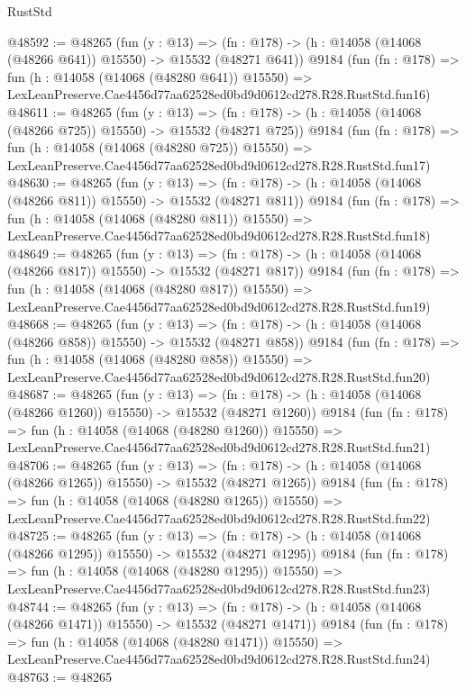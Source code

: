 \begin{lexlean}{RustStd}
\begin{coremodule}
@48592 := @48265
    (fun (y : @13) =>
    (fn : @178) -> (h : @14058 (@14068 (@48266 @641)) @15550) -> @15532 (@48271 @641))
    @9184
    (fun (fn : @178) =>
    fun (h : @14058 (@14068 (@48280 @641)) @15550) =>
    LexLeanPreserve.Cae4456d77aa62528ed0bd9d0612cd278.R28.RustStd.fun16)
@48611 := @48265
    (fun (y : @13) =>
    (fn : @178) -> (h : @14058 (@14068 (@48266 @725)) @15550) -> @15532 (@48271 @725))
    @9184
    (fun (fn : @178) =>
    fun (h : @14058 (@14068 (@48280 @725)) @15550) =>
    LexLeanPreserve.Cae4456d77aa62528ed0bd9d0612cd278.R28.RustStd.fun17)
@48630 := @48265
    (fun (y : @13) =>
    (fn : @178) -> (h : @14058 (@14068 (@48266 @811)) @15550) -> @15532 (@48271 @811))
    @9184
    (fun (fn : @178) =>
    fun (h : @14058 (@14068 (@48280 @811)) @15550) =>
    LexLeanPreserve.Cae4456d77aa62528ed0bd9d0612cd278.R28.RustStd.fun18)
@48649 := @48265
    (fun (y : @13) =>
    (fn : @178) -> (h : @14058 (@14068 (@48266 @817)) @15550) -> @15532 (@48271 @817))
    @9184
    (fun (fn : @178) =>
    fun (h : @14058 (@14068 (@48280 @817)) @15550) =>
    LexLeanPreserve.Cae4456d77aa62528ed0bd9d0612cd278.R28.RustStd.fun19)
@48668 := @48265
    (fun (y : @13) =>
    (fn : @178) -> (h : @14058 (@14068 (@48266 @858)) @15550) -> @15532 (@48271 @858))
    @9184
    (fun (fn : @178) =>
    fun (h : @14058 (@14068 (@48280 @858)) @15550) =>
    LexLeanPreserve.Cae4456d77aa62528ed0bd9d0612cd278.R28.RustStd.fun20)
@48687 := @48265
    (fun (y : @13) =>
    (fn : @178) -> (h : @14058 (@14068 (@48266 @1260)) @15550) -> @15532 (@48271 @1260))
    @9184
    (fun (fn : @178) =>
    fun (h : @14058 (@14068 (@48280 @1260)) @15550) =>
    LexLeanPreserve.Cae4456d77aa62528ed0bd9d0612cd278.R28.RustStd.fun21)
@48706 := @48265
    (fun (y : @13) =>
    (fn : @178) -> (h : @14058 (@14068 (@48266 @1265)) @15550) -> @15532 (@48271 @1265))
    @9184
    (fun (fn : @178) =>
    fun (h : @14058 (@14068 (@48280 @1265)) @15550) =>
    LexLeanPreserve.Cae4456d77aa62528ed0bd9d0612cd278.R28.RustStd.fun22)
@48725 := @48265
    (fun (y : @13) =>
    (fn : @178) -> (h : @14058 (@14068 (@48266 @1295)) @15550) -> @15532 (@48271 @1295))
    @9184
    (fun (fn : @178) =>
    fun (h : @14058 (@14068 (@48280 @1295)) @15550) =>
    LexLeanPreserve.Cae4456d77aa62528ed0bd9d0612cd278.R28.RustStd.fun23)
@48744 := @48265
    (fun (y : @13) =>
    (fn : @178) -> (h : @14058 (@14068 (@48266 @1471)) @15550) -> @15532 (@48271 @1471))
    @9184
    (fun (fn : @178) =>
    fun (h : @14058 (@14068 (@48280 @1471)) @15550) =>
    LexLeanPreserve.Cae4456d77aa62528ed0bd9d0612cd278.R28.RustStd.fun24)
@48763 := @48265

\end{coremodule}
\end{lexlean}
